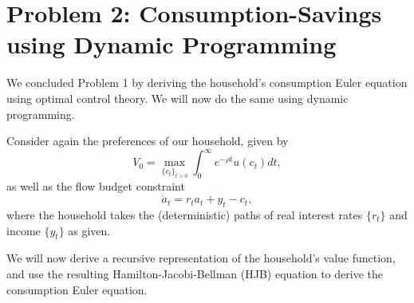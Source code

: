 \documentclass[11pt]{extarticle}
\theoremstyle{plain}
\theoremstyle{definition}
\begin{document}
\section*{Problem 2: Consumption-Savings using Dynamic Programming}

We concluded Problem 1 by deriving the household's consumption Euler equation using optimal control theory. We will now do the same using dynamic programming.


Consider again the preferences of our household, given by
\begin{equation*}
	V_0 = \max_{\{c_t\}_{t>0}} \int_0^\infty e^{-\rho t} u(c_t) dt,
\end{equation*}
as well as the flow budget constraint
\begin{equation*}
	\dot a_t = r_t a_t + y_t - c_t,
\end{equation*}
where the household takes the (deterministic) paths of real interest rates $\{r_t\}$ and income $\{y_t\}$ as given.


We will now derive a recursive representation of the household's value function, and use the resulting Hamilton-Jacobi-Bellman (HJB) equation to derive the consumption Euler equation.
\end{document}
